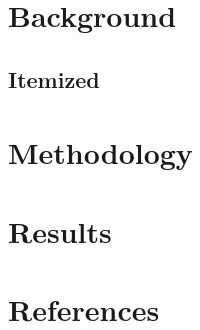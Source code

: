 \documentclass[xcolor=x11names,compress]{beamer}\usepackage[]{graphicx}\usepackage[]{color}
\renewcommand{\(}{\begin{columns}}
\renewcommand{\)}{\end{columns}}
\newcommand{\<}[1]{\begin{column}{#1}}
\renewcommand{\>}{\end{column}}
\begin{document}






\section{Background}
\subsection{Itemized}




\section{Methodology}


\section{Results}


\section{References}

\end{document}
